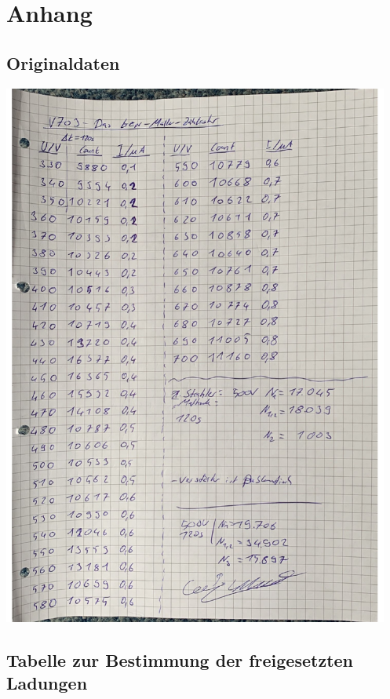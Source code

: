 \section{Anhang}
\label{sec:Anhang}
\subsection{Originaldaten}
\centering
\includegraphics[height=18cm]{content/pics/originaldaten/Originaldaten_1.pdf}

\subsection{Tabelle zur Bestimmung der freigesetzten Ladungen}

